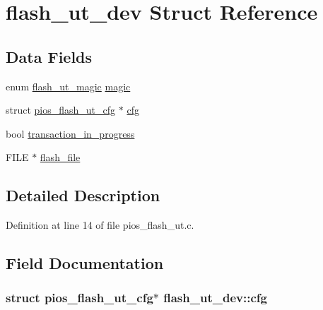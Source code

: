 \hypertarget{structflash__ut__dev}{\section{flash\-\_\-ut\-\_\-dev \-Struct \-Reference}
\label{structflash__ut__dev}
}
\subsection*{\-Data \-Fields}
\begin{DoxyCompactItemize}
\item 
enum \hyperlink{pios__flash__ut_8c_a9b498a69a687416b34b95a255083b7f6}{flash\-\_\-ut\-\_\-magic} \hyperlink{structflash__ut__dev_aefafb502345249d19bb9b82d91e1a4a7}{magic}
\item 
struct \hyperlink{structpios__flash__ut__cfg}{pios\-\_\-flash\-\_\-ut\-\_\-cfg} $\ast$ \hyperlink{structflash__ut__dev_a1bc1a8362c17b6cef6ca7d36dd3df8b7}{cfg}
\item 
bool \hyperlink{structflash__ut__dev_a326284da380f2645162916c9bd58625b}{transaction\-\_\-in\-\_\-progress}
\item 
\-F\-I\-L\-E $\ast$ \hyperlink{structflash__ut__dev_ab7546f7aa05d2a2a0eb9ce54b9d4620a}{flash\-\_\-file}
\end{DoxyCompactItemize}


\subsection{\-Detailed \-Description}


\-Definition at line 14 of file pios\-\_\-flash\-\_\-ut.\-c.



\subsection{\-Field \-Documentation}
\hypertarget{structflash__ut__dev_a1bc1a8362c17b6cef6ca7d36dd3df8b7}{
\subsubsection[{cfg}]{\setlength{\rightskip}{0pt plus 5cm}struct {\bf pios\-\_\-flash\-\_\-ut\-\_\-cfg}$\ast$ {\bf flash\-\_\-ut\-\_\-dev\-::cfg}}}\label{structflash__ut__dev_a1bc1a8362c17b6cef6ca7d36dd3df8b7}


